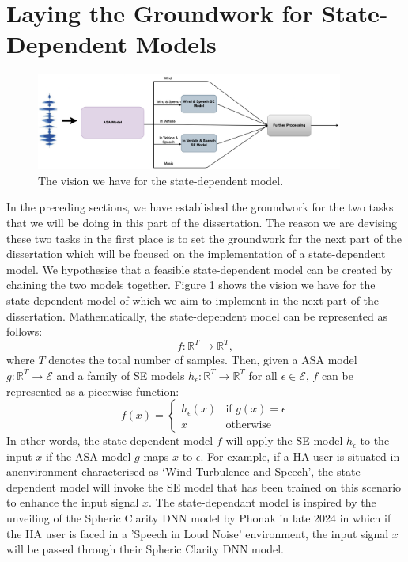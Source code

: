 \documentclass[logo,bsc,singlespacing,parskip,online]{infthesis}
\begin{document}
\section{Laying the Groundwork for State-Dependent Models}
\begin{figure}[h] \centering
   \includegraphics[width=0.9\textwidth]{state-model-diagram.png}
   \caption{The vision we have for the state-dependent model.}
   \label{fig:state-dependent-model}
\end{figure}
In the preceding sections, we have established the groundwork for the two tasks that we will be doing in this part of the dissertation.
The reason we are devising these two tasks in the first place is to set the groundwork for the next part of the dissertation which 
will be focused on the implementation of a state-dependent model. We hypothesise that a feasible state-dependent model can be created 
by chaining the two models together. Figure \ref{fig:state-dependent-model} shows the vision we have for the state-dependent model 
of which we aim to implement in the next part of the dissertation.
Mathematically, the state-dependent model can be represented as follows:
\[
f: \mathbb{R}^{T} \to \mathbb{R}^{T},
\]
where \(T\) denotes the total number of samples. 
Then, given a ASA model $g : \mathbb{R}^{T} \to \mathcal{E}$ and a family of SE models $h_{\epsilon} : \mathbb{R}^{T} \to \mathbb{R}^{T}$ for all \(\epsilon \in \mathcal{E}\), 
$f$ can be represented as a piecewise function:
\begin{equation}
   f(x) = 
   \begin{cases} 
      h_{\epsilon}(x) & \text{if } g(x) = \epsilon \\
      x & \text{otherwise}
   \end{cases}
\end{equation}
In other words, the state-dependent model $f$ will apply the SE model $h_{\epsilon}$ to the input $x$ if the ASA model $g$ maps $x$ to \(\epsilon\).
For example, if a HA user is situated in anenvironment characterised as `Wind Turbulence and Speech',
the state-dependent model will invoke the SE model that has been trained on this scenario to enhance the input signal $x$.
The state-dependant model is inspired by the unveiling of the Spheric Clarity DNN model by Phonak \citep{Hasemann2024PhonakSphere} in late 2024
in which if the HA user is faced in a 'Speech in Loud Noise' environment, the input signal $x$ will be passed through their Spheric Clarity DNN model.
\end{document}

